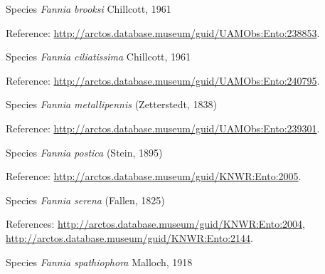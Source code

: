\documentclass[9pt, article]{memoir}
\begin{document}
\begin{multicols}{2}
\vspace{6pt}\noindent\hspace{36pt}Species \textit{Fannia brooksi} Chillcott, 1961


\vspace{6pt}Reference: 
\url{http://arctos.database.museum/guid/UAMObs:Ento:238853}.

\vspace{6pt}\noindent\hspace{36pt}Species \textit{Fannia ciliatissima} Chillcott, 1961


\vspace{6pt}Reference: 
\url{http://arctos.database.museum/guid/UAMObs:Ento:240795}.

\vspace{6pt}\noindent\hspace{36pt}Species \textit{Fannia metallipennis} (Zetterstedt, 1838)


\vspace{6pt}Reference: 
\url{http://arctos.database.museum/guid/UAMObs:Ento:239301}.

\vspace{6pt}\noindent\hspace{36pt}Species \textit{Fannia postica} (Stein, 1895)


\vspace{6pt}Reference: 
\url{http://arctos.database.museum/guid/KNWR:Ento:2005}.

\vspace{6pt}\noindent\hspace{36pt}Species \textit{Fannia serena} (Fallen, 1825)


\vspace{6pt}References: 
\url{http://arctos.database.museum/guid/KNWR:Ento:2004}, 
\url{http://arctos.database.museum/guid/KNWR:Ento:2144}.

\vspace{6pt}\noindent\hspace{36pt}Species \textit{Fannia spathiophora} Malloch, 1918



\end{multicols}
\end{document}
